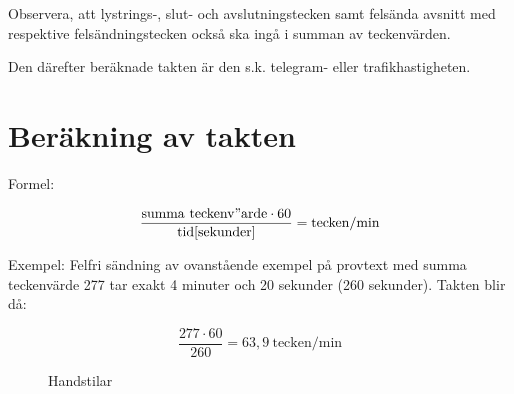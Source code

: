 Observera, att lystrings-, slut- och avslutningstecken samt felsända avsnitt med
respektive felsändningstecken också ska ingå i summan av teckenvärden.

Den därefter beräknade takten är den s.k. telegram- eller trafikhastigheten.

\section{Beräkning av takten}

Formel:

$$\frac{\mathrm{summa\ teckenv"arde }\cdot 60}{\mathrm{tid} [\mathrm{sekunder}]}
= \mathrm{tecken/min}$$

Exempel: Felfri sändning av ovanstående exempel på provtext med summa
teckenvärde 277 tar exakt 4 minuter och 20 sekunder (260 sekunder). Takten blir
då:

$$\frac{277 \cdot 60}{260} = 63,9\ \mathrm{tecken/min}$$

\begin{figure}
  \caption{Handstilar}
  \label{fig:bild_morse_7}
\end{figure}

